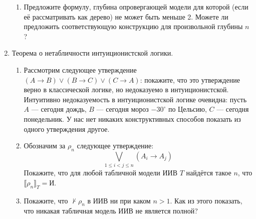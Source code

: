 \documentclass[10pt,a4paper,oneside]{article}
\begin{document}
\begin{enumerate}
\begin{enumerate}
\item Предложите формулу, глубина опровергающей модели для которой (если её рассматривать как 
дерево) не может быть меньше 2. Можете ли предложить соответствующую конструкцию для произвольной 
глубины $n$?
\end{enumerate}

\item Теорема о нетабличности интуиционистской логики.
\begin{enumerate}
\item Рассмотрим следующее утверждение $(A \to B)\vee(B\to C)\vee(C \to A)$: 
покажите, что это утверждение верно в классической логике, но недоказуемо в интуиционистской. 
Интуитивно недоказуемость в интуиционистской логике очевидна: пусть $A$ --- сегодня дождь, 
$B$ --- сегодня мороз $-30^\circ$ по Цельсию,  $C$ --- сегодня понедельник. 
У нас нет никаких конструктивных способов показать из одного утверждения другое.

\item Обозначим за $\rho_n$ следующее утверждение:
$$\bigvee_{1 \le i < j \le n} (A_i \to A_j)$$ 
Покажите, что для любой табличной модели ИИВ $T$ найдётся такое $n$,
что $\llbracket \rho_n \rrbracket_T = \texttt{И}$.

\item Покажите, что $\nvdash \rho_n$ в ИИВ ни при каком $n > 1$. Как из этого показать, 
что никакая табличная модель ИИВ не является полной?
\end{enumerate}

\end{enumerate}
\end{document}
